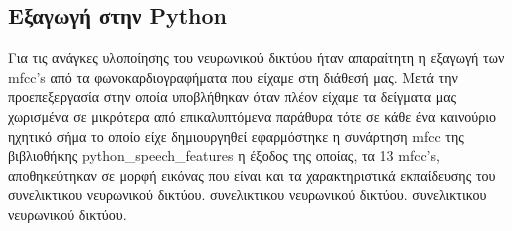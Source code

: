 \subsection{Eξαγωγή στην Python}
Για τις ανάγκες υλοποίησης του νευρωνικού δικτύου ήταν απαραίτητη η εξαγωγή των
mfcc's από τα φωνοκαρδιογραφήματα  που είχαμε στη διάθεσή μας. Μετά την
προεπεξεργασία στην οποία υποβλήθηκαν όταν πλέον είχαμε τα δείγματα μας
χωρισμένα σε μικρότερα από επικαλυπτόμενα παράθυρα τότε σε κάθε ένα καινούριο
ηχητικό σήμα το οποίο είχε δημιουργηθεί εφαρμόστηκε η συνάρτηση mfcc της
βιβλιοθήκης python\_speech\_features η έξοδος της οποίας, τα 13 mfcc's,
αποθηκεύτηκαν σε μορφή εικόνας που είναι και τα χαρακτηριστικά εκπαίδευσης  του
συνελικτικου νευρωνικού δικτύου.
συνελικτικου νευρωνικού δικτύου.
συνελικτικου νευρωνικού δικτύου.
